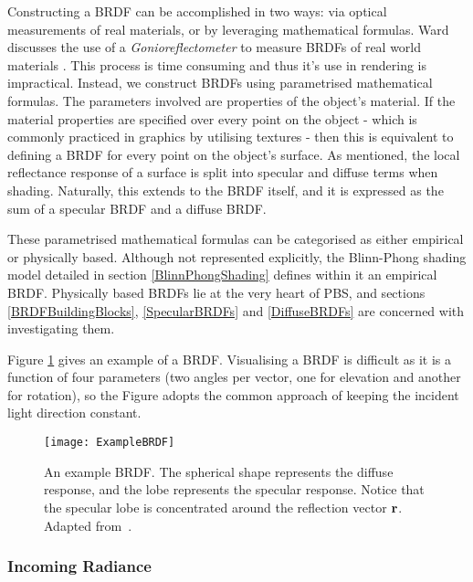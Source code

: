 Constructing a BRDF can be accomplished in two ways: via optical measurements of real materials, or by leveraging mathematical formulas. Ward discusses the use of a \textit{Gonioreflectometer} to measure BRDFs of real world materials \cite{MeasuringAnisotropicReflections}. This process is time consuming and thus it's use in rendering is impractical. Instead, we construct BRDFs using parametrised mathematical formulas. The parameters involved are properties of the object's material. If the material properties are specified over every point on the object - which is commonly practiced in graphics by utilising textures - then this is equivalent to defining a BRDF for every point on the object's surface. As mentioned, the local reflectance response of a surface is split into specular and diffuse terms when shading. Naturally, this extends to the BRDF itself, and it is expressed as the sum of a specular BRDF and a diffuse BRDF.

These parametrised mathematical formulas can be categorised as either empirical or physically based. Although not represented explicitly, the Blinn-Phong shading model detailed in section \ref{BlinnPhongShading} defines within it an empirical BRDF. Physically based BRDFs lie at the very heart of PBS, and sections \ref{BRDFBuildingBlocks}, \ref{SpecularBRDFs} and \ref{DiffuseBRDFs} are concerned with investigating them.

Figure \ref{fig:ExampleBRDF} gives an example of a BRDF. Visualising a BRDF is difficult as it is a function of four parameters (two angles per vector, one for elevation and another for rotation), so the Figure adopts the common approach of keeping the incident light direction constant.

\begin{figure}[h]
	\centering
	\texttt{[image: ExampleBRDF]}
	\caption{An example BRDF. The spherical shape represents the diffuse response, and the lobe represents the specular response. Notice that the specular lobe is concentrated around the reflection vector \begin{math}\mathbf{r}\end{math}. Adapted from~\cite{FaulInfluenceOfFresnelEffect}.}
	\label{fig:ExampleBRDF}
\end{figure}

\subsubsection{Incoming Radiance}

